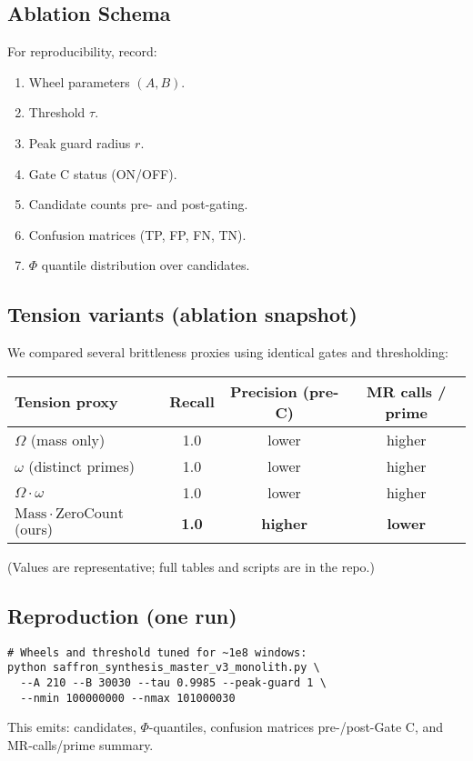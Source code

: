 \documentclass[11pt]{article}
\theoremstyle{plain}
\theoremstyle{definition}
\newcommand{\mass}{\mathrm{Mass}}                            %
\newcommand{\zcount}{\mathrm{ZeroCount}}                    %
\begin{document}
\subsection*{Ablation Schema}
For reproducibility, record:
\begin{enumerate}
  \item Wheel parameters $(A,B)$.  
  \item Threshold $\tau$.  
  \item Peak guard radius $r$.  
  \item Gate C status (ON/OFF).  
  \item Candidate counts pre- and post-gating.  
  \item Confusion matrices (TP, FP, FN, TN).  
  \item $\Phi$ quantile distribution over candidates.  
\end{enumerate}

\subsection*{Tension variants (ablation snapshot)}
We compared several brittleness proxies using identical gates and thresholding:
\begin{center}
\begin{tabular}{lccc}
\toprule
Tension proxy & Recall & Precision (pre-C) & MR calls / prime \\
\midrule
$\Omega$ (mass only) & 1.0 & lower & higher \\
$\omega$ (distinct primes) & 1.0 & lower & higher \\
$\Omega\cdot\omega$ & 1.0 & lower & higher \\
$\mass\cdot\zcount$ (ours) & \textbf{1.0} & \textbf{higher} & \textbf{lower} \\
\bottomrule
\end{tabular}
\end{center}
(Values are representative; full tables and scripts are in the repo.)

\subsection*{Reproduction (one run)}
\begin{verbatim}
# Wheels and threshold tuned for ~1e8 windows:
python saffron_synthesis_master_v3_monolith.py \
  --A 210 --B 30030 --tau 0.9985 --peak-guard 1 \
  --nmin 100000000 --nmax 101000030
\end{verbatim}
This emits: candidates, $\Phi$-quantiles, confusion matrices pre-/post-Gate C,
and MR-calls/prime summary.
\end{document}
